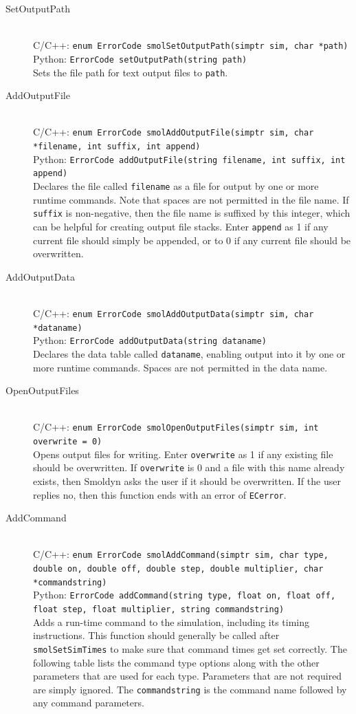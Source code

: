 \documentclass {book}
\newcommand {\ttt} {\texttt}
\begin{document}
\begin{description}

\item[SetOutputPath]
\hfill \\
C/C++: \ttt{enum ErrorCode smolSetOutputPath(simptr sim, char *path)}\\
Python: \ttt{ErrorCode setOutputPath(string path)}\\
Sets the file path for text output files to \ttt{path}.

\item[AddOutputFile]
\hfill \\
C/C++: \ttt{enum ErrorCode smolAddOutputFile(simptr sim, char *filename, int suffix, int append)}\\
Python: \ttt{ErrorCode addOutputFile(string filename, int suffix, int append)}\\
Declares the file called \ttt{filename} as a file for output by one or more runtime commands. Note that spaces are not permitted in the file name. If \ttt{suffix} is non-negative, then the file name is suffixed by this integer, which can be helpful for creating output file stacks. Enter \ttt{append} as 1 if any current file should simply be appended, or to 0 if any current file should be overwritten.

\item[AddOutputData]
\hfill \\
C/C++: \ttt{enum ErrorCode smolAddOutputData(simptr sim, char *dataname)}\\
Python: \ttt{ErrorCode addOutputData(string dataname)}\\
Declares the data table called \ttt{dataname}, enabling output into it by one or more runtime commands. Spaces are not permitted in the data name.

\item[OpenOutputFiles]
\hfill \\
C/C++: \ttt{enum ErrorCode smolOpenOutputFiles(simptr sim, int overwrite = 0)}\\
Opens output files for writing. Enter \ttt{overwrite} as 1 if any existing file should be overwritten. If \ttt{overwrite} is 0 and a file with this name already exists, then Smoldyn asks the user if it should be overwritten. If the user replies no, then this function ends with an error of \ttt{ECerror}.

\item[AddCommand]
\hfill \\
C/C++: \ttt{enum ErrorCode smolAddCommand(simptr sim, char type, double on, double off, double step, double multiplier, char *commandstring)}\\
Python: \ttt{ErrorCode addCommand(string type, float on, float off, float step, float multiplier, string commandstring)}\\
Adds a run-time command to the simulation, including its timing instructions. This function should generally be called after \ttt{smolSetSimTimes} to make sure that command times get set correctly. The following table lists the command type options along with the other parameters that are used for each type. Parameters that are not required are simply ignored. The \ttt{commandstring} is the command name followed by any command parameters.


\end{description}
\end{document}
